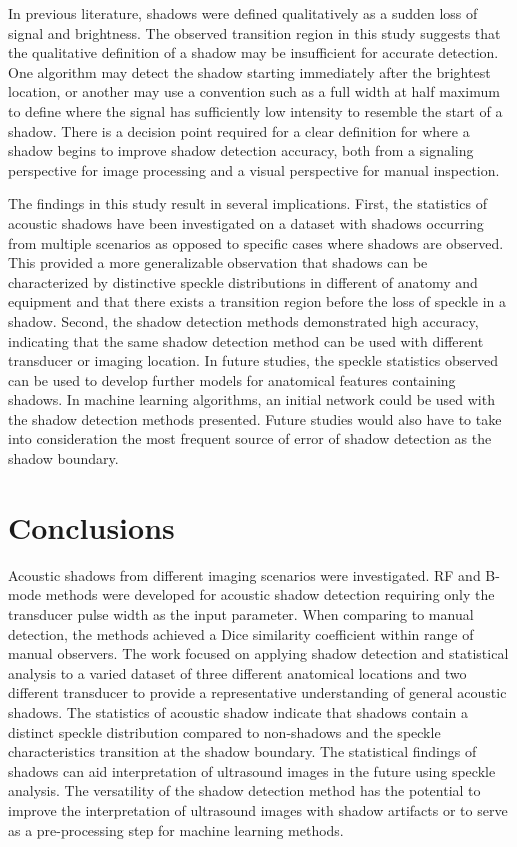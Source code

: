 \documentclass[authoryear,preprint,review,12pt]{elsarticle}
\begin{document}
In previous literature, shadows were defined qualitatively \citep{Kremkau1986} as a sudden loss of signal and brightness. The observed transition region in this study suggests that the qualitative definition of a shadow may be insufficient for accurate detection. One algorithm may detect the shadow starting immediately after the brightest location, or another may use a convention such as a full width at half maximum to define where the signal has sufficiently low intensity to resemble the start of a shadow. There is a decision point required for a clear definition for where a shadow begins to improve shadow detection accuracy, both from a signaling perspective for image processing and a visual perspective for manual inspection. 


The findings in this study result in several implications. First, the statistics of acoustic shadows have been investigated on a dataset with shadows occurring from multiple scenarios as opposed to specific cases where shadows are observed. This provided a more generalizable observation that shadows can be characterized by distinctive speckle distributions in different of anatomy and equipment and that there exists a transition region before the loss of speckle in a shadow. Second, the shadow detection methods demonstrated high accuracy, indicating that the same shadow detection method can be used with different transducer or imaging location. In future studies, the speckle statistics observed can be used to develop further models for anatomical features containing shadows. In machine learning algorithms, an initial network could be used with the shadow detection methods presented. Future studies would also have to take into consideration the most frequent source of error of shadow detection as the shadow boundary.

\section*{Conclusions}
\label{Conclusions}
Acoustic shadows from different imaging scenarios were investigated. RF and B-mode methods were developed for acoustic shadow detection requiring only the transducer pulse width as the input parameter. When comparing to manual detection, the methods achieved a Dice similarity coefficient within range of manual observers. The work focused on applying shadow detection and statistical analysis to a varied dataset of three different anatomical locations and two different transducer to provide a representative understanding of general acoustic shadows. The statistics of acoustic shadow indicate that shadows contain a distinct speckle distribution compared to non-shadows and the speckle characteristics transition at the shadow boundary. The statistical findings of shadows can aid interpretation of ultrasound images in the future using speckle analysis. The versatility of the shadow detection method has the potential to improve the interpretation of ultrasound images with shadow artifacts or to serve as a pre-processing step for machine learning methods.
\end{document}
